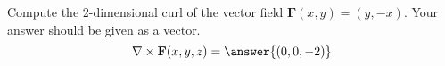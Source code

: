 \begin{problem}
Compute the 2-dimensional curl of the vector field $\mathbf{F}(x,y) = (y,-x)$. Your answer should be given as a vector.
\[
\nabla\times\mathbf{F}(x,y,z) = \answer{(0,0,-2)}
\]
\end{problem}
